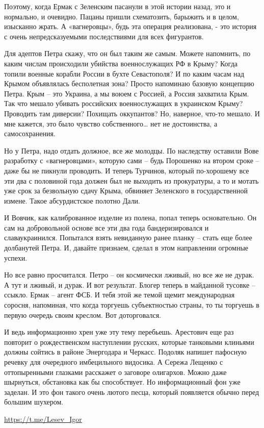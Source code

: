Поэтому, когда Ермак с Зеленским пасанули в этой истории назад, это и
нормально, и очевидно. Пацаны пришли схематозить, барыжить и в целом, изысканно
жрать. А «вагнеровцы», будь эта операция реализована, - это история с очень
непредсказуемыми последствиями для всех фигурантов.

Для адептов Петра скажу, что он был таким же самым. Можете напомнить, по каким
числам происходили убийства военнослужащих РФ в Крыму? Когда топили военные
корабли России в бухте Севастополя? И по каким часам над Крымом объявлялась
бесполетная зона? Просто напоминаю базовую концепцию Петра. Крым – это Украина,
а мы воюем с Россией, а Россия захватила Крым. Так что мешало убивать
российских военнослужащих в украинском Крыму? Проводить там диверсии? Похищать
оккупантов? Но, наверное, что-то мешало. И мне кажется, это было чувство
собственного… нет не достоинства, а самосохранения.

Но у Петра, надо отдать должное, все же молодцы. По наследству оставили Вове
разработку с «вагнеровцами», которую сами – будь Порошенко на втором сроке –
даже бы не пикнули проводить. И теперь Турчинов, который по-хорошему все эти
два с половиной года должен был не выходить из прокуратуры, а то и мотать уже
срок за безвольную сдачу Крыма, обвиняет Зеленского в государственной измене.
Такое абсурдистское полотно Дали.

И Вовчик, как калиброванное изделие из полена, попал теперь основательно. Он
сам на добровольной основе все эти два года бандеризировался и славаукраинился.
Попытался взять невиданную ранее планку – стать еще более долбанутей Петра. И,
давайте признаем, сделал в этом направлении огромные успехи. 

Но все равно просчитался. Петро – он космически лживый, но все же не дурак. А
тут и лживый, и дурак. И вот результат. Блогер теперь в майданной тусовке –
ссыкло. Ермак – агент ФСБ. И тебя этой же темой щемит международная соросня,
напоминая, что когда торгуешь субъектностью страны, то ты торгуешь в первую
очередь своим креслом. Вот доторговался.

И ведь информационно хрен уже эту тему перебьешь. Арестович еще раз повторит о
рождественском наступлении русских, которые танковыми клиньями должны сойтись в
районе Энергодара и Черкасс. Подоляк напишет пафосную речевку для очередного
имбецильного видосика. А Сережа Лещенко с оттопыренными глазками расскажет о
заговоре олигархов. Можно даже шырнуться, обстановка как бы способствует. Но
информационный фон уже заделан. И это фон такого очень лютого песца, который
появляется обычно перед большим шухером.

\url{https://t.me/Lesev_Igor}

